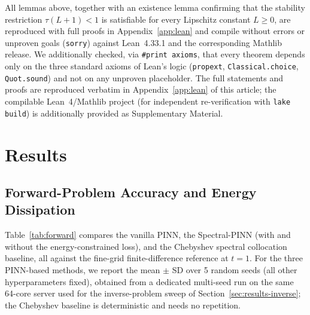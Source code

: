 \documentclass[symmetry,article,submit,moreauthors]{Definitions/mdpi}
\begin{document}
All lemmas above, together with an existence lemma confirming that the stability restriction $\tau(L+1)<1$ is satisfiable for every Lipschitz constant $L\ge0$, are reproduced with full proofs in Appendix~\ref{app:lean} and compile without errors or unproven goals (\texttt{sorry}) against Lean~4.33.1 and the corresponding Mathlib release. We additionally checked, via \texttt{\#print axioms}, that every theorem depends only on the three standard axioms of Lean's logic (\texttt{propext}, \texttt{Classical.choice}, \texttt{Quot.sound}) and not on any unproven placeholder. The full statements and proofs are reproduced verbatim in Appendix~\ref{app:lean} of this article; the compilable Lean~4/Mathlib project (for independent re-verification with \texttt{lake build}) is additionally provided as Supplementary Material.

\section{Results}

\subsection{Forward-Problem Accuracy and Energy Dissipation}

Table~\ref{tab:forward} compares the vanilla PINN, the Spectral-PINN (with and without the energy-constrained loss), and the Chebyshev spectral collocation baseline, all against the fine-grid finite-difference reference at $t=1$. For the three PINN-based methods, we report the mean $\pm$ SD over 5 random seeds (all other hyperparameters fixed), obtained from a dedicated multi-seed run on the same 64-core server used for the inverse-problem sweep of Section~\ref{sec:results-inverse}; the Chebyshev baseline is deterministic and needs no repetition.
\end{document}
